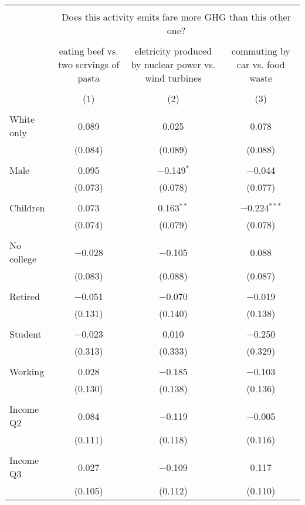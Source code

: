 
\begin{tabular}{@{\extracolsep{5pt}}lccc} 
\\[-1.8ex]\hline 
\hline \\[-1.8ex] 
 & \multicolumn{3}{c}{Does this activity emits fare more GHG than this other one?} \\ 
\cline{2-4} 
\\[-1.8ex] & eating beef vs. two servings of pasta & eletricity produced by nuclear power vs. wind turbines & commuting by car vs. food waste \\ 
\\[-1.8ex] & (1) & (2) & (3)\\ 
\hline \\[-1.8ex] 
 White only & 0.089 & 0.025 & 0.078 \\ 
  & (0.084) & (0.089) & (0.088) \\ 
  & & & \\ 
 Male & 0.095 & $-$0.149$^{*}$ & $-$0.044 \\ 
  & (0.073) & (0.078) & (0.077) \\ 
  & & & \\ 
 Children & 0.073 & 0.163$^{**}$ & $-$0.224$^{***}$ \\ 
  & (0.074) & (0.079) & (0.078) \\ 
  & & & \\ 
 No college & $-$0.028 & $-$0.105 & 0.088 \\ 
  & (0.083) & (0.088) & (0.087) \\ 
  & & & \\ 
 Retired & $-$0.051 & $-$0.070 & $-$0.019 \\ 
  & (0.131) & (0.140) & (0.138) \\ 
  & & & \\ 
 Student & $-$0.023 & 0.010 & $-$0.250 \\ 
  & (0.313) & (0.333) & (0.329) \\ 
  & & & \\ 
 Working & 0.028 & $-$0.185 & $-$0.103 \\ 
  & (0.130) & (0.138) & (0.136) \\ 
  & & & \\ 
 Income Q2 & 0.084 & $-$0.119 & $-$0.005 \\ 
  & (0.111) & (0.118) & (0.116) \\ 
  & & & \\ 
 Income Q3 & 0.027 & $-$0.109 & 0.117 \\ 
  & (0.105) & (0.112) & (0.110) \\ 

\end{tabular}
